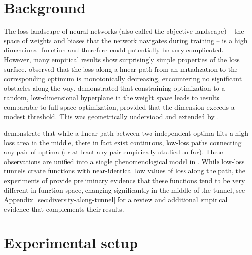 \documentclass{article}
\begin{document}
%
%
%
%
%


%

%


%

\section{Background}
%

The loss landscape of neural networks (also called the objective landscape) -- the space of weights and biases that the network navigates during training -- is a high dimensional function and therefore could potentially be very complicated. However, many empirical results show surprisingly simple properties of the loss surface. \citet{Goodfellow2014QualitativelyCN} observed that the loss along a linear path from an initialization to the corresponding optimum is monotonically decreasing, encountering no significant obstacles along the way. \citet{li2018measuring} demonstrated that constraining optimization to a random, low-dimensional hyperplane in the weight space leads to results comparable to full-space optimization, provided that the dimension exceeds a modest threshold. This was geometrically understood and extended by \citet{fort2019goldilocks}.

\citet{garipov2018loss,draxler2018essentially} demonstrate that while a linear path between two independent optima hits a high loss area in the middle, there in fact exist continuous, low-loss paths connecting any pair of optima (or at least any pair empirically studied so far). These observations are unified into a single phenomenological model in \citep{fort2019large}. %
%
%
%
%
While low-loss tunnels create functions with near-identical low values of loss along the path, the experiments of  \citet{fort2019large,garipov2018loss} provide preliminary evidence that these functions tend to be very different in function space, changing significantly in the middle of the tunnel, see Appendix~\ref{sec:diversity-along-tunnel} for a review and additional empirical evidence that complements their results. 

%

\section{Experimental setup}

%
%
%
%
%
%
%
%
%
%
%
%
%
%
%
%
%
%
\end{document}
